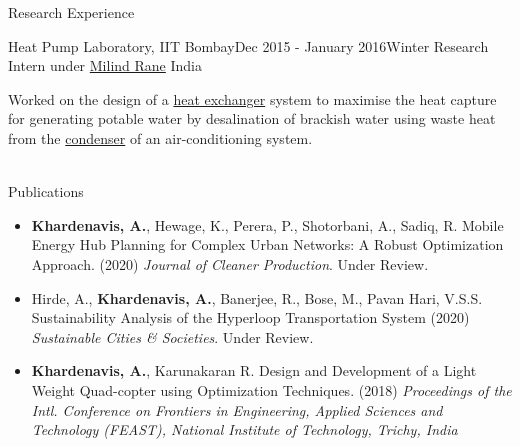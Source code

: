 \documentclass{resume} %
\begin{document}
\begin{rSection}{Research Experience}
\begin{rSubsection}{Heat Pump Laboratory, IIT Bombay}{Dec 2015 - January 2016}{Winter Research Intern under  \href{https://www.me.iitb.ac.in/?q=faculty/Prof.\%20Milind\%20V.\%20Rane}{Milind Rane}} {India}
\item  Worked on the design of a \href{https://en.wikipedia.org/wiki/Heat_exchanger}{heat exchanger} system to maximise the heat capture for generating potable water by desalination of brackish water using waste heat from the \href{https://en.wikipedia.org/wiki/Condenser_(heat_transfer)}{condenser} of an air-conditioning system.\\
\\
\end{rSubsection}
\end{rSection}

\vspace*{-5mm}
\begin{rSection}{Publications}
\begin{itemize}[leftmargin=*]
\item\textbf{Khardenavis, A.}, Hewage, K., Perera, P., Shotorbani, A., Sadiq, R. Mobile Energy Hub Planning for Complex Urban Networks: A Robust Optimization Approach. (2020) \textit{Journal of Cleaner Production}. Under Review. 
\item Hirde, A., \textbf{Khardenavis, A.}, Banerjee, R., Bose, M., Pavan Hari, V.S.S. Sustainability Analysis of the Hyperloop Transportation System (2020) \textit{Sustainable Cities \& Societies}. Under Review. 
\item\textbf{Khardenavis, A.}, Karunakaran R. Design and Development of a Light Weight Quad-copter using Optimization Techniques. (2018) \textit{Proceedings of the Intl. Conference on Frontiers in Engineering, Applied Sciences and Technology (FEAST), National Institute of Technology, Trichy, India} 
\end{itemize}
\end{rSection}

\vspace*{-1.5mm}
\end{document}
